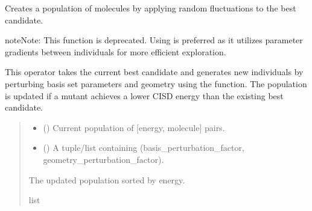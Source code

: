 \documentclass[letterpaper,10pt,english]{sphinxmanual}
\begin{document}

\begin{fulllineitems}
\label{\detokenize{api:MSTOOptpar.Mutate}}
\pysigstartsignatures
\pysiglinewithargsret
{}
{\sphinxparamcomma {}}
{}
\pysigstopsignatures
\sphinxAtStartPar
Creates a population of molecules by applying random fluctuations to the best candidate.

\begin{sphinxadmonition}{note}{Note:}
\sphinxAtStartPar
This function is deprecated. Using {\hyperref[\detokenize{api:MSTOOptpar.Mutate_v2}]{}} is preferred as it
utilizes parameter gradients between individuals for more efficient exploration.
\end{sphinxadmonition}

\sphinxAtStartPar
This operator takes the current best candidate and generates new individuals
by perturbing basis set parameters and geometry using the {\hyperref[\detokenize{api:MSTOOptpar.dmol}]{}} function.
The population is updated if a mutant achieves a lower CISD energy than the
existing best candidate.
\begin{quote}\begin{description}
\begin{itemize}
\item {} 
\sphinxAtStartPar
{} () \textendash{} Current population of {[}energy, molecule{]} pairs.

\item {} 
\sphinxAtStartPar
{} () \textendash{} A tuple/list containing (basis\_perturbation\_factor, geometry\_perturbation\_factor).

\end{itemize}

\sphinxAtStartPar
The updated population sorted by energy.

\sphinxAtStartPar
list

\end{description}\end{quote}

\end{fulllineitems}
\end{document}
